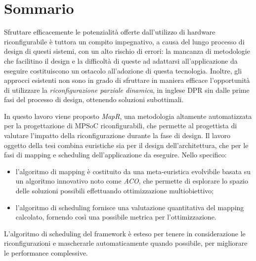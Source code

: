 \chapter*{Sommario}
\vspace{0.5cm}
Sfruttare efficacemente le potenzialit\`a offerte dall'utilizzo di hardware riconfigurabile
\`e tuttora un compito impegnativo, a causa del lungo processo di design di questi sistemi,
con un alto rischio di errori: la mancanza di metodologie che facilitino il design e
la difficolt\`a di queste ad adattarsi all'applicazione da eseguire costituiscono
un ostacolo all'adozione di questa tecnologia.
Inoltre, gli approcci esistenti non sono in grado di sfruttare in maniera efficace
l'opportunit\`a di utilizzare la \emph{riconfigurazione parziale dinamica}, in inglese
\ac{DPR} sin dalle prime fasi del processo di design, ottenendo soluzioni subottimali.

In questo lavoro viene proposto \emph{MapR}, una metodologia
altamente automatizzata per la progettazione di \acs{MPSoC} riconfigurabili, che permette
al progettista di valutare l'impatto della riconfigurazione durante la fase di design.
Il lavoro oggetto della tesi combina euristiche sia per il design dell'architettura, che per
le fasi di mapping e scheduling dell'applicazione da eseguire.
Nello specifico:
\begin{itemize}
  \item l'algoritmo di mapping \`e costituito da una meta-euristica evolvibile basata su un
    algoritmo innovativo noto come \emph{\ac{ACO}}, che permette di esplorare lo spazio delle
    soluzioni possibili effettuando ottimizzazione multiobiettivo;
  \item l'algoritmo di scheduling fornisce una valutazione quantitativa del mapping calcolato,
    fornendo cos\`i una possibile metrica per l'ottimizzazione.
\end{itemize}
L'algoritmo di scheduling del framework \`e esteso per tenere in considerazione
le riconfigurazioni e mascherarle automaticamente quando possibile, per migliorare le
performance complessive.

